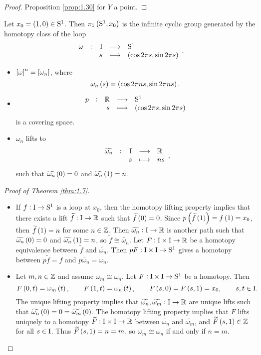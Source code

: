 \begin{proof}
Proposition \ref{prop:1.30} for $ Y $ a point.
\end{proof}

\pagebreak

\begin{theorem}
\label{thm:1.7}
Let $ x_0 = \br{1, 0} \in \S^1 $. Then $ \pi_1\br{\S^1, x_0} $ is the infinite cyclic group generated by the homotopy class of the loop
$$ \function[\omega]{\I}{\S^1}{s}{\br{\cos 2\pi s, \sin 2\pi s}}. $$
\end{theorem}

\begin{remark*}
\hfill
\begin{itemize}
\item $ \sbr{\omega}^n = \sbr{\omega_n} $, where
$$ \omega_n\br{s} = \br{\cos 2\pi ns, \sin 2\pi ns}. $$
\item
$$ \function[p]{\RR}{\S^1}{s}{\br{\cos 2\pi s, \sin 2\pi s}} $$
is a covering space.
\item $ \omega_n $ lifts to
$$ \function[\widetilde{\omega_n}]{\I}{\RR}{s}{ns}, $$
such that $ \widetilde{\omega_n}\br{0} = 0 $ and $ \widetilde{\omega_n}\br{1} = n $.
\end{itemize}
\end{remark*}

\begin{proof}[Proof of Theorem \ref{thm:1.7}]
\hfill
\begin{itemize}
\item If $ f : \mathrm{I} \to \mathrm{S}^1 $ is a loop at $ x_0 $, then the homotopy lifting property implies that there exists a lift $ \widetilde{f} : \mathrm{I} \to \mathbb{R} $ such that $ \widetilde{f}\br{0} = 0 $. Since $ p\br{\widetilde{f}\br{1}} = f\br{1} = x_0 $, then $ \widetilde{f}\br{1} = n $ for some $ n \in \mathbb{Z} $. Then $ \widetilde{\omega_n} : \mathrm{I} \to \mathbb{R} $ is another path such that $ \widetilde{\omega_n}\br{0} = 0 $ and $ \widetilde{\omega_n}\br{1} = n $, so $ \widetilde{f} \cong \widetilde{\omega_n} $. Let $ F : \mathrm{I} \times \mathrm{I} \to \mathbb{R} $ be a homotopy equivalence between $ \widetilde{f} $ and $ \widetilde{\omega_n} $. Then $ pF : \mathrm{I} \times \mathrm{I} \to \mathrm{S}^1 $ gives a homotopy between $ p\widetilde{f} = f $ and $ p\widetilde{\omega_n} = \omega_n $.
\item Let $ m, n \in \mathbb{Z} $ and assume $ \omega_m \cong \omega_n $. Let $ F : \mathrm{I} \times \mathrm{I} \to \mathrm{S}^1 $ be a homotopy. Then
$$ F\br{0, t} = \omega_m\br{t}, \qquad F\br{1, t} = \omega_n\br{t}, \qquad F\br{s, 0} = F\br{s, 1} = x_0, \qquad s, t \in \I. $$
The unique lifting property implies that $ \widetilde{\omega_n}, \widetilde{\omega_m} : \mathrm{I} \to \mathbb{R} $ are unique lifts such that $ \widetilde{\omega_n}\br{0} = 0 = \widetilde{\omega_m}\br{0} $. The homotopy lifting property implies that $ F $ lifts uniquely to a homotopy $ \widetilde{F} : \mathrm{I} \times \mathrm{I} \to \mathbb{R} $ between $ \widetilde{\omega_n} $ and $ \widetilde{\omega_m} $, and $ \widetilde{F}\br{s, 1} \in \ZZ $ for all $ s \in \mathrm{I} $. Thus $ \widetilde{F}\br{s, 1} = n = m $, so $ \omega_m \cong \omega_n $ if and only if $ n = m $.
\end{itemize}
\end{proof}

